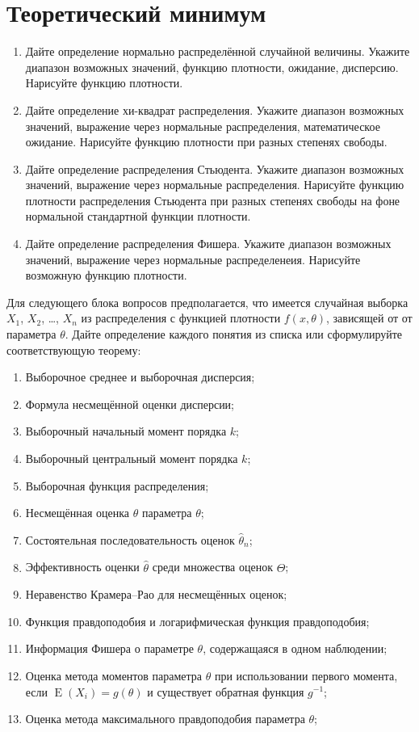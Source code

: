 \documentclass[12pt]{article}
\DeclareMathOperator{\E}{E}
\begin{document}
\section{Теоретический минимум}

\begin{enumerate}
  \item Дайте определение нормально распределённой случайной величины. Укажите диапазон возможных значений, функцию плотности, ожидание, дисперсию. Нарисуйте функцию плотности.
  \item Дайте определение хи-квадрат распределения. Укажите диапазон возможных значений, выражение через нормальные распределения, математическое ожидание. Нарисуйте функцию плотности при разных степенях свободы.
  \item Дайте определение распределения Стьюдента. Укажите диапазон возможных значений, выражение через нормальные распределения. Нарисуйте функцию плотности распределения Стьюдента при разных степенях свободы на фоне нормальной стандартной функции плотности.
  \item Дайте определение распределения Фишера. Укажите диапазон возможных значений, выражение через нормальные распределенеия. Нарисуйте возможную функцию плотности.
\end{enumerate}

Для следующего блока вопросов предполагается, что 
имеется случайная выборка $X_1$, $X_2$, \ldots, $X_n$ из распределения 
с функцией плотности $f(x, \theta)$, зависящей от от параметра $\theta$. Дайте определение каждого понятия из списка или сформулируйте соответствующую теорему:

\begin{enumerate}[resume]
  \item Выборочное среднее и выборочная дисперсия;
  \item Формула несмещённой оценки дисперсии;
  \item Выборочный начальный момент порядка $k$;
  \item Выборочный центральный момент порядка $k$;
  \item Выборочная функция распределения;
  \item Несмещённая оценка $\hat \theta$ параметра $\theta$;
  \item Состоятельная последовательность оценок $\hat \theta_n$;
  \item Эффективность оценки $\hat \theta$ среди множества оценок $\hat \Theta$;
  \item Неравенство Крамера–Рао для несмещённых оценок;
  \item Функция правдоподобия и логарифмическая функция правдоподобия;
  \item Информация Фишера о параметре $\theta$, содержащаяся в одном наблюдении;
  \item Оценка метода моментов параметра $\theta$ при использовании первого момента, если $\E(X_i)=g(\theta)$ и существует обратная функция $g^{-1}$;
  \item Оценка метода максимального правдоподобия параметра $\theta$;
\end{enumerate}
\end{document}
